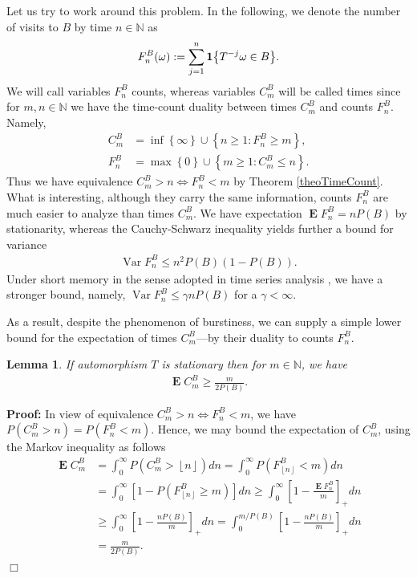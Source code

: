 \documentclass[a4paper,12pt]{article}
\newcommand{\kwad}[1]{\left[ #1 \right]}
\newcommand{\klam}[1]{\left\{ #1 \right\}}
\newcommand{\floor}[1]{\left\lfloor #1 \right\rfloor}
\DeclareMathOperator{\var}{Var}
\DeclareMathOperator{\mean}{\mathbf{E}}
\newcommand{\boole}[1]{{\bf 1}{\klam{#1}}}
\newtheorem{lemma}{Lemma}
\newenvironment*{proof}{\begin{trivlist}\item[]
\noindent\textbf{Proof:}}{$\Box$\par\end{trivlist}}
\begin{document}
Let us try to work around this problem.  In the following, we denote
the number of visits to $B$ by time $n\in\mathbb{N}$ as
\begin{align}
  F^B_n(\omega):=\sum_{j=1}^n \boole{T^{-j}\omega\in B}.
\end{align}
We will call variables $F^B_n$ counts, whereas variables $C^B_m$ will
be called times since for $m,n\in\mathbb{N}$ we have the time-count
duality between times $C^B_m$ and counts $F^B_n$. Namely,
\begin{align}
  C^B_m&=\inf\klam{\infty}\cup\klam{n\ge 1: F^B_n\ge m},
  \\
  F^B_n&=\max\klam{0}\cup\klam{m\ge 1: C^B_m\le n}.
\end{align}
Thus we have equivalence $C^B_m>n\iff F^B_n<m$ by Theorem
\ref{theoTimeCount}.  What is interesting, although they carry the
same information, counts $F^B_n$ are much easier to analyze than times
$C^B_m$.  We have expectation $\mean F^B_n=nP(B)$ by stationarity,
whereas the Cauchy-Schwarz inequality yields further a bound for
variance
\begin{align}
 \var F^B_n\le n^2P(B)(1-P(B)).
\end{align}
Under short memory in the sense adopted in time series analysis
\citep{Beran94}, we have a stronger bound, namely,
$\var F^B_n\le\gamma nP(B)$ for a $\gamma<\infty$.

As a result, despite the phenomenon of burstiness, we can supply a
simple lower bound for the expectation of times $C^B_m$---by their
duality to counts $F^B_n$.
\begin{lemma}
  \label{theoUnconditional}
  If automorphism $T$ is stationary then for $m\in\mathbb{N}$, we have
  \begin{align}
    \mean C^B_m
    \ge
    \frac{m}{2P(B)}.
  \end{align}
\end{lemma}
\begin{proof}
  In view of equivalence $C^B_m>n\iff F^B_n<m$, we have
  $P(C^B_m>n)=P(F^B_n<m)$.  Hence, we may bound the expectation of
  $C^B_m$, using the Markov inequality as follows
  \begin{align}
    \mean C^B_m
    &=
    \int_0^\infty P(C^B_m>\floor{n}) dn
    =
    \int_0^\infty P(F^B_{\floor{n}}<m) dn
      \nonumber\\
    &=
      \int_0^\infty \kwad{1-P(F^B_{\floor{n}}\ge m)} dn
      \ge
      \int_0^\infty \kwad{1-\frac{\mean F^B_n}{m}}_+ dn
      \nonumber\\
    &\ge
      \int_0^\infty \kwad{1-\frac{nP(B)}{m}}_+ dn
      =
      \int_0^{m/P(B)} \kwad{1-\frac{nP(B)}{m}}_+ dn
      \nonumber\\
    &=
      \frac{m}{2P(B)}.
  \end{align}
\end{proof}
\end{document}
